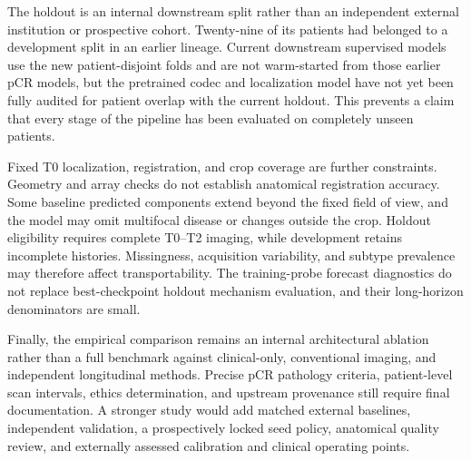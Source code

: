 The holdout is an internal downstream split rather than an independent external institution or prospective cohort. Twenty-nine of its patients had belonged to a development split in an earlier lineage. Current downstream supervised models use the new patient-disjoint folds and are not warm-started from those earlier pCR models, but the pretrained codec and localization model have not yet been fully audited for patient overlap with the current holdout. This prevents a claim that every stage of the pipeline has been evaluated on completely unseen patients.

Fixed T0 localization, registration, and crop coverage are further constraints. Geometry and array checks do not establish anatomical registration accuracy. Some baseline predicted components extend beyond the fixed field of view, and the model may omit multifocal disease or changes outside the crop. Holdout eligibility requires complete T0--T2 imaging, while development retains incomplete histories. Missingness, acquisition variability, and subtype prevalence may therefore affect transportability. The training-probe forecast diagnostics do not replace best-checkpoint holdout mechanism evaluation, and their long-horizon denominators are small.

Finally, the empirical comparison remains an internal architectural ablation rather than a full benchmark against clinical-only, conventional imaging, and independent longitudinal methods. Precise pCR pathology criteria, patient-level scan intervals, ethics determination, and upstream provenance still require final documentation. A stronger study would add matched external baselines, independent validation, a prospectively locked seed policy, anatomical quality review, and externally assessed calibration and clinical operating points.
